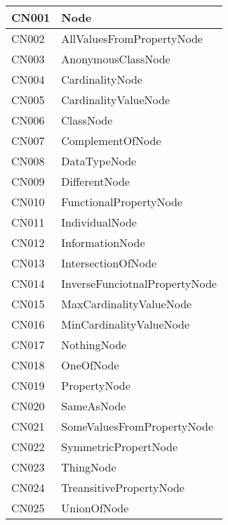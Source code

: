 \begin{longtable}{|m{4cm}|m{8cm}|} \hline
CN001  & Node  \\ \hline
CN002  & AllValuesFromPropertyNode \\ \hline
CN003  & AnonymousClassNode \\ \hline
CN004  & CardinalityNode \\ \hline
CN005  & CardinalityValueNode \\ \hline
CN006  & ClassNode \\ \hline
CN007  & ComplementOfNode \\ \hline
CN008  & DataTypeNode \\ \hline
CN009  & DifferentNode \\ \hline
CN010  & FunctionalPropertyNode \\ \hline
CN011  & IndividualNode \\ \hline
CN012  & InformationNode \\ \hline
CN013  & IntersectionOfNode \\ \hline 
CN014  & InverseFunciotnalPropertyNode \\ \hline 
CN015  & MaxCardinalityValueNode \\ \hline 
CN016  & MinCardinalityValueNode \\ \hline 
CN017  & NothingNode \\ \hline 
CN018  & OneOfNode \\ \hline 
CN019  & PropertyNode \\ \hline 
CN020  & SameAsNode \\ \hline 
CN021  & SomeValuesFromPropertyNode \\ \hline 
CN022  & SymmetricPropertNode \\ \hline 
CN023  & ThingNode \\ \hline 
CN024  & TreansitivePropertyNode \\ \hline 
CN025  & UnionOfNode \\ \hline 




\end{longtable}